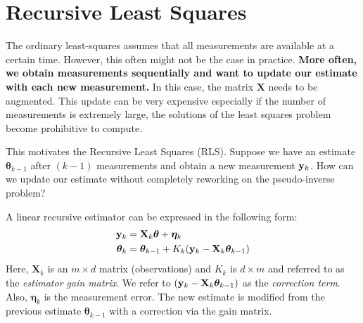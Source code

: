 \section{Recursive Least Squares}
\label{sec:recursive_least_square}

The ordinary least-squares assumes that all measurements are available at a certain time. However, this often might not be the case in practice. \textbf{More often, we obtain measurements sequentially and want to update our estimate with each new measurement.} In this case, the matrix $\mathbf{X}$ needs to be augmented. This update can be very expensive especially if the number of measurements is extremely large, the solutions of the least squares problem become prohibitive to compute. 

This motivates the Recursive Least Squares (RLS). Suppose we have an estimate $\boldsymbol{\theta}_{k-1}$ after $(k-1)$ measurements and obtain a new measurement ${\mathbf{y}}_k$. How can we update our estimate without completely reworking on the pseudo-inverse problem?

A linear recursive estimator can be expressed in the following form:
\begin{align*}
	{\mathbf{y}}_k &= \mathbf{X}_k\boldsymbol{\theta}+\boldsymbol{\eta}_k\\
	\boldsymbol{\theta}_k &= \boldsymbol{\theta}_{k-1}+K_k ({\mathbf{y}}_k-\mathbf{X}_k\boldsymbol{\theta}_{k-1})
\end{align*}
Here, $\mathbf{X}_k$ is an $m\times d$ matrix (observations) and $K_k$ is $d\times m$ and referred to as the \textit{estimator gain matrix}. We refer to $({\mathbf{y}}_k-\mathbf{X}_k\boldsymbol{\theta}_{k-1})$ as the \textit{correction term}. Also, $\boldsymbol{\eta}_k$ is the measurement error. The new estimate is modified from the previous estimate $\boldsymbol{\theta}_{k-1}$ with a correction via the gain matrix. 

